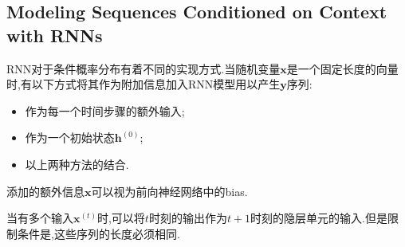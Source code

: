 \subsection{Modeling Sequences Conditioned on Context with RNNs}

RNN对于条件概率分布有着不同的实现方式.当随机变量$\mathbf x$是一个固定长度的向量时,有以下方式将其作为附加信息加入RNN模型用以产生$\mathbf y$序列:
\begin{itemize}
    \item 作为每一个时间步骤的额外输入;
    \item 作为一个初始状态$\mathbf h^{(0)}$;
    \item 以上两种方法的结合.
\end{itemize}
添加的额外信息$\mathbf x$可以视为前向神经网络中的bias.

当有多个输入$\mathbf x^{(t)}$时,可以将$t$时刻的输出作为$t+1$时刻的隐层单元的输入.但是限制条件是,这些序列的长度必须相同.
